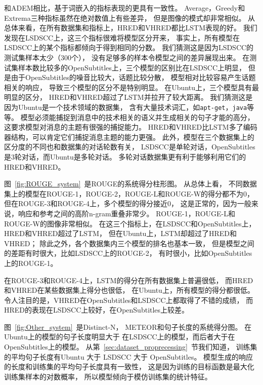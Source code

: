 和ADEM相比，基于词嵌入的指标表现的更具有一致性。
Average，Greedy和Extrema三种指标虽然在绝对数值上有些差异，
但是图像的模式却非常相似。
从总体来看，在所有数据集和指标上，HRED和VHRED都比LSTM表现的好。
我们发现在LSDSCC上，这三个指标很难将模型区分开来，
事实上，所有模型在LSDSCC上的某个指标都倾向于得到相同的分数。
我们猜测这是因为LSDSCC的测试集样本太少（300个），
没有足够多的样本令模型之间的差异展现出来。
在测试集样本数比较多的OpenSubtitles上，三个模型的区别比在LSDSCC上明显，
但是由于OpenSubtitles的噪音比较大，话题比较分散，
模型相对比较容易产生话题相关的响应，
导致三个模型的区分不是特别明显。
在Ubuntu上，三个模型具有最明显的区分，
HRED和VHRED超过了LSTM并拉开了较大距离。
我们猜测这是因为Ubuntu是一个技术领域的数据集，
含有大量技术词汇，如\texttt{apt-get}，\texttt{java}等等。
模型必须能捕捉到消息中的技术相关的语义并生成相关的句子才能的高分，
这要求模型对消息的主题有很强的捕捉能力。
HRED和VHRED比LSTM多了编码器结构，可以肯定它们捕捉消息主题的能力更强。
此外，模型在三个数据集上的区分度的不同也和数据集的对话轮数有关，
LSDSCC是单轮对话，OpenSubtitles是3轮对话，而Ubuntu是多轮对话。
多轮对话数据集更有利于能够利用它们的HRED和VHRED。


图~\ref{fig:ROUGE_system}~是ROUGE的系统得分柱形图。
从总体上看，
不同数据集上的模型在ROUGE-1，ROUGE-2，ROUGE-L和ROUGE-W的得分都不为0，
但在ROUGE-3和ROUGE-4上，多个模型的得分接近0，
这是正常的，因为一般来说，响应和参考之间的高阶n-gram重叠非常少。
ROUGE-1，ROUGE-L和ROUGE-W的图像非常相似。
在这三个指标上，在LSDSCC和OpenSubtitles上，HRED和VHRED超过了LSTM，
但在Ubuntu上，LSTM却超过了HRED和VHRED；
除此之外，各个数据集内三个模型的排名也基本一致，
但是模型之间的差距有时很大，比如LSDSCC上的ROUGE-2，
有时很小，比如OpenSubtitles上的ROUGE-1。

在ROUGE-3和ROUGE-4上，LSTM的得分在所有数据集上普遍很低，
而HRED和VHRED在某些数据集上得分也很低，
在Ubuntu上，所有模型的得分都很低。
令人注目的是，VHRED在OpenSubtitles和LSDSCC上都取得了不错的成绩，
而HRED的表现在LSDSCC上较好，在OpenSubtitles上较差。


图~\ref{fig:Other_system}~是Distinct-N，
METEOR和句子长度的系统得分图。
在Ubuntu上的模型的句子长度明显大于
在LSDSCC上的模型，而后者大于在OpenSubtitles上的模型。
从第~\ref{sec:dataset_proprecessing}~节我们知道，
训练集的平均句子长度有Ubuntu 大于 LSDSCC 大于 OpenSubtitles。
模型生成的响应的长度和训练集的平均句子长度具有一致性，
这是因为训练的目标函数是最大化训练集样本的对数概率，
所以模型倾向于模仿训练集的统计特征。

